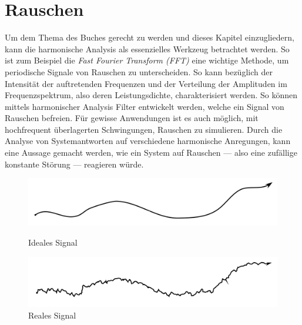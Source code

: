 %
%
%
%

\section{Rauschen\label{brown:Rauschen}}

Um dem Thema des Buches gerecht zu werden und dieses Kapitel einzugliedern, kann die harmonische Analysis als essenzielles Werkzeug betrachtet werden. So ist zum Beispiel die \textit{Fast Fourier Transform (FFT)} eine wichtige Methode, um periodische Signale von Rauschen zu unterscheiden. So kann bezüglich der Intensität der auftretenden Frequenzen und der Verteilung der Amplituden im Frequenzspektrum, also deren Leistungsdichte, charakterisiert werden. 
So können mittels harmonischer Analysis Filter entwickelt werden, welche ein Signal von Rauschen befreien. Für gewisse Anwendungen ist es auch möglich, mit hochfrequent überlagerten Schwingungen, Rauschen zu simulieren. Durch die Analyse von Systemantworten auf verschiedene harmonische Anregungen, kann eine Aussage gemacht werden, wie ein System auf Rauschen --- also eine zufällige konstante Störung --- reagieren würde. 

\begin{figure}
	\centering
	\begin{minipage}{0.48\textwidth}
		\centering
		\includegraphics[width=\textwidth]{papers/brown/images/idealSignal2.png}
		\caption{Ideales Signal}
		\label{idealSignal}
	\end{minipage}
	\begin{minipage}{0.48\textwidth}
		\centering
		\includegraphics[width=\textwidth]{papers/brown/images/realSignal2.png}
		\caption{Reales Signal}
		\label{realSignal}
	\end{minipage}
\end{figure}

